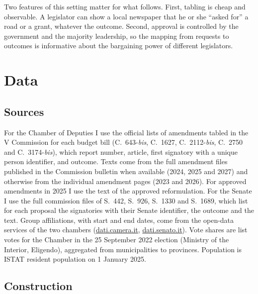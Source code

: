 \documentclass[12pt]{article}
\begin{document}
Two features of this setting matter for what follows. First, tabling is cheap and observable. A legislator can show a local newspaper that he or she ``asked for'' a road or a grant, whatever the outcome. Second, approval is controlled by the government and the majority leadership, so the mapping from requests to outcomes is informative about the bargaining power of different legislators.

\section{Data}\label{sec:data}

\subsection{Sources}

For the Chamber of Deputies I use the official lists of amendments tabled in the V Commission for each budget bill (C.~643-\emph{bis}, C.~1627, C.~2112-\emph{bis}, C.~2750 and C.~3174-\emph{bis}), which report number, article, first signatory with a unique person identifier, and outcome. Texts come from the full amendment files published in the Commission bulletin when available (2024, 2025 and 2027) and otherwise from the individual amendment pages (2023 and 2026). For approved amendments in 2025 I use the text of the approved reformulation. For the Senate I use the full commission files of S.~442, S.~926, S.~1330 and S.~1689, which list for each proposal the signatories with their Senate identifier, the outcome and the text. Group affiliations, with start and end dates, come from the open-data services of the two chambers (\url{dati.camera.it}, \url{dati.senato.it}). Vote shares are list votes for the Chamber in the 25 September 2022 election (Ministry of the Interior, Eligendo), aggregated from municipalities to provinces. Population is ISTAT resident population on 1 January 2025.

\subsection{Construction}
\end{document}
